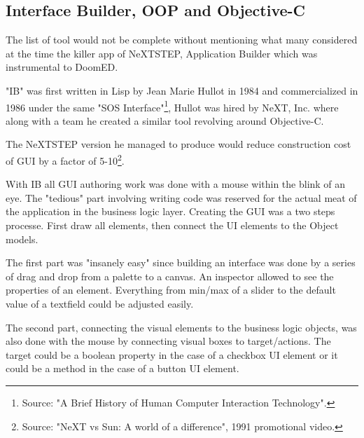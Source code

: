 \subsection{Interface Builder, OOP and Objective-C}
The list of tool would not be complete without mentioning what many considered at the time the killer app of NeXTSTEP, Application Builder which was instrumental to DoomED.\\
\par
"IB" was first written in Lisp by Jean Marie Hullot in 1984 and commercialized in 1986 under the same "SOS Interface"\footnote{Source: "A Brief History of Human Computer Interaction Technology".}, Hullot was hired by NeXT, Inc. where along with a team he created a similar tool revolving around Objective-C.\\
\par
The NeXTSTEP version he managed to produce would reduce construction cost of GUI by a factor of 5-10\footnote{Source: "NeXT vs Sun: A world of a difference", 1991 promotional video.}.\\
\par
{}
\par
 With IB all GUI authoring work was done with a mouse within the blink of an eye. The "tedious" part involving writing code was reserved for the actual meat of the application in the business logic layer. Creating the GUI was a two steps processe. First draw all elements, then connect the UI elements to the Object models.\\
\par
The first part was "insanely easy" since building an interface was done by a series of drag and drop from a palette to a canvas. An inspector allowed to see the properties of an element. Everything from min/max of a slider to the default value of a textfield could be adjusted easily.\\
\par
The second part, connecting the visual elements to the business logic objects, was also done with the mouse by connecting visual boxes to target/actions. The target could be a boolean property in the case of a checkbox UI element or it could be a method in the case of a button UI element.

